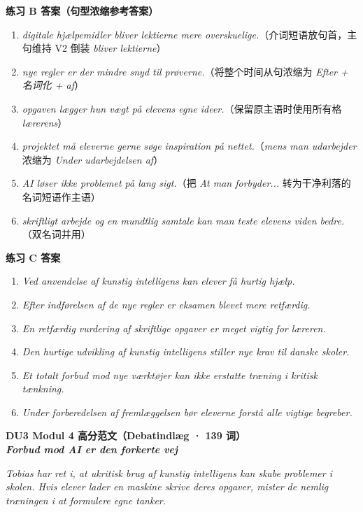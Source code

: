 \begin{answerbox}
\textbf{练习 B 答案（句型浓缩参考答案）}
\begin{enumerate}
  \item \textit{ digitale hjælpemidler bliver lektierne mere overskuelige.}（介词短语放句首，主句维持 V2 倒装 \textit{bliver lektierne}）
  \item \textit{ nye regler er der mindre snyd til prøverne.}（将整个时间从句浓缩为 \textit{Efter + 名词化 + af}）
  \item \textit{ opgaven lægger hun vægt på elevens egne ideer.}（保留原主语时使用所有格 \textit{lærerens}）
  \item \textit{ projektet må eleverne gerne søge inspiration på nettet.}（\textit{mens man udarbejder} 浓缩为 \textit{Under udarbejdelsen af}）
  \item \textit{ AI løser ikke problemet på lang sigt.}（把 \textit{At man forbyder...} 转为干净利落的名词短语作主语）
  \item \textit{ skriftligt arbejde og en mundtlig samtale kan man teste elevens viden bedre.}（双名词并用）
\end{enumerate}

\textbf{练习 C 答案}
\begin{enumerate}
  \item \textit{Ved anvendelse af kunstig intelligens kan elever få hurtig hjælp.}
  \item \textit{Efter indførelsen af de nye regler er eksamen blevet mere retfærdig.}
  \item \textit{En retfærdig vurdering af skriftlige opgaver er meget vigtig for læreren.}
  \item \textit{Den hurtige udvikling af kunstig intelligens stiller nye krav til danske skoler.}
  \item \textit{Et totalt forbud mod nye værktøjer kan ikke erstatte træning i kritisk tænkning.}
  \item \textit{Under forberedelsen af fremlæggelsen bør eleverne forstå alle vigtige begreber.}
\end{enumerate}

\textbf{DU3 Modul 4 高分范文（Debatindlæg · 139 词）}\\
\textit{\textbf{Forbud mod AI er den forkerte vej}}

\textit{Tobias har ret i, at ukritisk brug af kunstig intelligens kan skabe problemer i skolen. Hvis elever lader en maskine skrive deres opgaver, mister de nemlig træningen i at formulere egne tanker.}


\end{answerbox}
